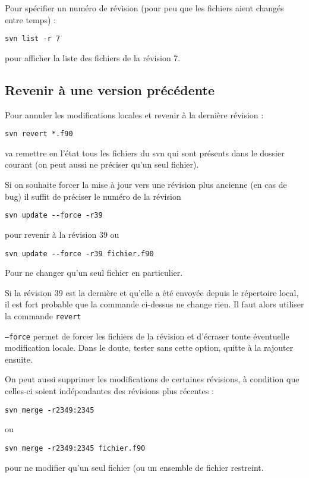 \documentclass[a4paper,twoside]{article}
\begin{document}
Pour spécifier un numéro de révision (pour peu que les fichiers aient changés entre temps) : 
\begin{verbatim}
svn list -r 7
\end{verbatim}
pour afficher la liste des fichiers de la révision 7.

\subsection{Revenir à une version précédente} 
Pour annuler les modifications locales et revenir à la dernière révision : 
\begin{verbatim}
svn revert *.f90
\end{verbatim}
va remettre en l'état tous les fichiers du svn qui sont présents dans le dossier courant (on peut aussi ne préciser qu'un seul fichier).

\bigskip

Si on souhaite forcer la mise à jour vers une révision plus ancienne (en cas de bug) il suffit de préciser le numéro de la révision
\begin{verbatim}
svn update --force -r39
\end{verbatim}
pour revenir à la révision $39$ ou 
\begin{verbatim}
svn update --force -r39 fichier.f90
\end{verbatim}
Pour ne changer qu'un seul fichier en particulier.

\begin{remarque}
Si la révision $39$ est la dernière et qu'elle a été envoyée depuis le répertoire local, il est fort probable que la commande ci-dessus ne change rien. Il faut alors utiliser la commande \texttt{revert}

\texttt{--force} permet de forcer les fichiers de la révision et d'écraser toute éventuelle modification locale. Dans le doute, tester sans cette option, quitte à la rajouter ensuite.
\end{remarque}


\bigskip

On peut aussi supprimer les modifications de certaines révisions, à condition que celles-ci soient indépendantes des révisions plus récentes : 
\begin{verbatim}
svn merge -r2349:2345
\end{verbatim}
ou
\begin{verbatim}
svn merge -r2349:2345 fichier.f90
\end{verbatim}
pour ne modifier qu'un seul fichier (ou un ensemble de fichier restreint.
\end{document}
